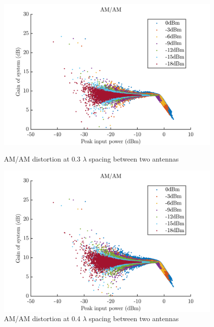 \begin{figure}[H]
  \centering
  \begin{minipage}[b]{0.5\textwidth}
	\includegraphics[scale = 0.5]{figures/measurement/two_antenna/amam_03.png}
	\caption{AM/AM distortion at 0.3 $\lambda$ spacing between two antennas}
    \label{fig:amam03}
  \end{minipage}
  \hfill
  \begin{minipage}[b]{0.4\textwidth}
\includegraphics[scale = 0.5]{figures/measurement/two_antenna/amam_04.png}
\caption{AM/AM distortion at 0.4 $\lambda$ spacing between two antennas}
    \label{fig:amam04}
  \end{minipage}
\end{figure}


